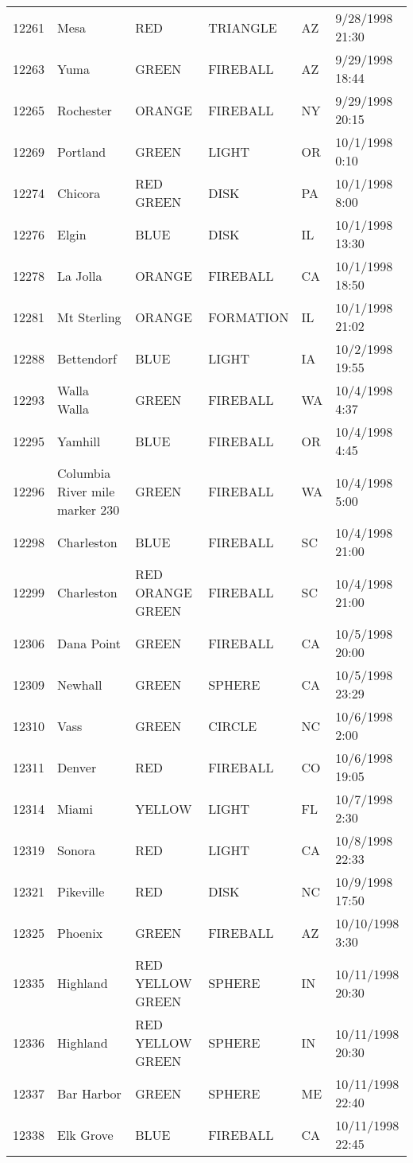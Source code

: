 \begin{tabular}{llllll}
12261 & Mesa & RED & TRIANGLE & AZ & 9/28/1998 21:30 \\
12263 & Yuma & GREEN & FIREBALL & AZ & 9/29/1998 18:44 \\
12265 & Rochester & ORANGE & FIREBALL & NY & 9/29/1998 20:15 \\
12269 & Portland & GREEN & LIGHT & OR & 10/1/1998 0:10 \\
12274 & Chicora & RED GREEN & DISK & PA & 10/1/1998 8:00 \\
12276 & Elgin & BLUE & DISK & IL & 10/1/1998 13:30 \\
12278 & La Jolla & ORANGE & FIREBALL & CA & 10/1/1998 18:50 \\
12281 & Mt Sterling & ORANGE & FORMATION & IL & 10/1/1998 21:02 \\
12288 & Bettendorf & BLUE & LIGHT & IA & 10/2/1998 19:55 \\
12293 & Walla Walla & GREEN & FIREBALL & WA & 10/4/1998 4:37 \\
12295 & Yamhill & BLUE & FIREBALL & OR & 10/4/1998 4:45 \\
12296 & Columbia River { mile marker 230} & GREEN & FIREBALL & WA & 10/4/1998 5:00 \\
12298 & Charleston & BLUE & FIREBALL & SC & 10/4/1998 21:00 \\
12299 & Charleston & RED ORANGE GREEN & FIREBALL & SC & 10/4/1998 21:00 \\
12306 & Dana Point & GREEN & FIREBALL & CA & 10/5/1998 20:00 \\
12309 & Newhall & GREEN & SPHERE & CA & 10/5/1998 23:29 \\
12310 & Vass & GREEN & CIRCLE & NC & 10/6/1998 2:00 \\
12311 & Denver & RED & FIREBALL & CO & 10/6/1998 19:05 \\
12314 & Miami & YELLOW & LIGHT & FL & 10/7/1998 2:30 \\
12319 & Sonora & RED & LIGHT & CA & 10/8/1998 22:33 \\
12321 & Pikeville & RED & DISK & NC & 10/9/1998 17:50 \\
12325 & Phoenix & GREEN & FIREBALL & AZ & 10/10/1998 3:30 \\
12335 & Highland & RED YELLOW GREEN & SPHERE & IN & 10/11/1998 20:30 \\
12336 & Highland & RED YELLOW GREEN & SPHERE & IN & 10/11/1998 20:30 \\
12337 & Bar Harbor & GREEN & SPHERE & ME & 10/11/1998 22:40 \\
12338 & Elk Grove & BLUE & FIREBALL & CA & 10/11/1998 22:45 \\

\end{tabular}
